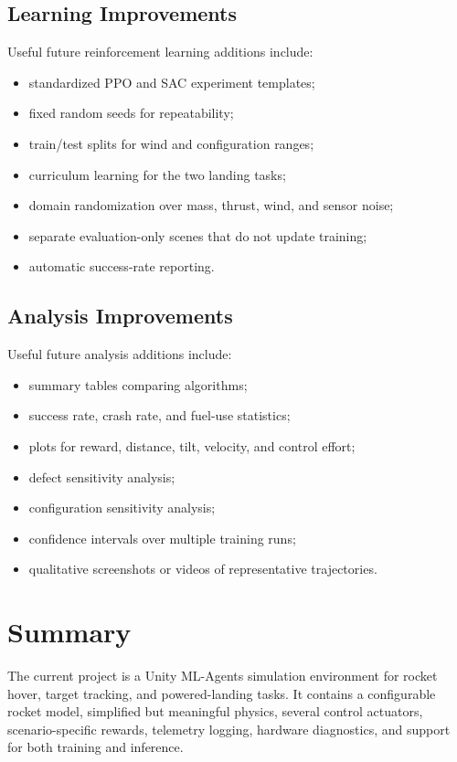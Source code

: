 \documentclass[12pt,a4paper]{article}
\begin{document}
\subsection{Learning Improvements}

Useful future reinforcement learning additions include:

\begin{itemize}
    \item standardized PPO and SAC experiment templates;
    \item fixed random seeds for repeatability;
    \item train/test splits for wind and configuration ranges;
    \item curriculum learning for the two landing tasks;
    \item domain randomization over mass, thrust, wind, and sensor noise;
    \item separate evaluation-only scenes that do not update training;
    \item automatic success-rate reporting.
\end{itemize}

\subsection{Analysis Improvements}

Useful future analysis additions include:

\begin{itemize}
    \item summary tables comparing algorithms;
    \item success rate, crash rate, and fuel-use statistics;
    \item plots for reward, distance, tilt, velocity, and control effort;
    \item defect sensitivity analysis;
    \item configuration sensitivity analysis;
    \item confidence intervals over multiple training runs;
    \item qualitative screenshots or videos of representative trajectories.
\end{itemize}

\section{Summary}

The current project is a Unity ML-Agents simulation environment for rocket hover, target tracking, and powered-landing tasks. It contains a configurable rocket model, simplified but meaningful physics, several control actuators, scenario-specific rewards, telemetry logging, hardware diagnostics, and support for both training and inference.
\end{document}
